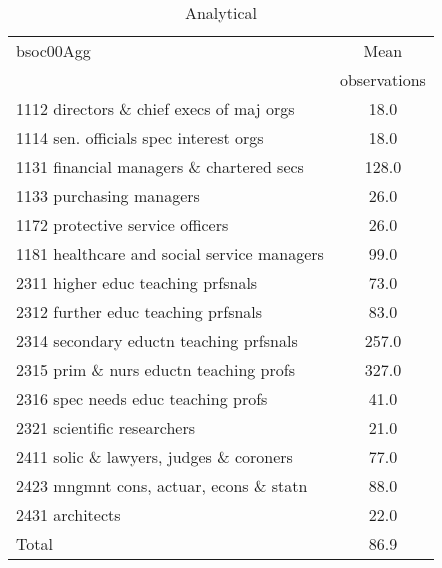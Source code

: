 \begin{table}
	\centering
	\caption{Analytical}
	\begin{tabular}{lc}
	\toprule	
		
bsoc00Agg&Mean \\
&observations \\
\hline
1112 directors \& chief execs of maj orgs&18.0 \\
1114 sen. officials spec interest orgs&18.0 \\
1131 financial managers \& chartered secs&128.0 \\
1133 purchasing managers&26.0 \\
1172 protective service officers&26.0 \\
1181 healthcare and social service managers&99.0 \\
2311 higher educ teaching prfsnals&73.0 \\
2312 further educ teaching prfsnals&83.0 \\
2314 secondary eductn teaching prfsnals&257.0 \\
2315 prim \& nurs eductn teaching profs&327.0 \\
2316 spec needs educ teaching profs&41.0 \\
2321 scientific researchers&21.0 \\
2411 solic \& lawyers, judges \& coroners&77.0 \\
2423 mngmnt cons, actuar, econs \& statn&88.0 \\
2431 architects&22.0 \\
Total&86.9 \\
\bottomrule
\bottomrule
\end{tabular}
\end{table}

